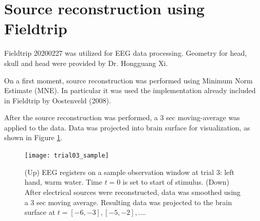 \documentclass[10pt,letterpaper]{article}
\begin{document}
\section{Source reconstruction using Fieldtrip}

Fieldtrip 20200227 was utilized for EEG data processing. 
Geometry for head, skull and head were provided by Dr. Hongguang Xi.

On a first moment, source reconstruction was performed using Minimum Norm Estimate (MNE).
In particular it was used the implementation already included in Fieldtrip by Oostenveld (2008).

After the source reconstruction was performed, a 3 sec moving-average was applied to the data.
Data was projected into brain surface for visualization, as shown in Figure \ref{fig:sample}.

\begin{figure}
\centering
	\texttt{[image: trial03\_sample]}
	\caption{(Up) EEG registers on a sample observation window at trial 3: left hand, warm water.
	Time $t=0$ is set to start of stimulus. (Down) After electrical sources were reconstructed,
	data was smoothed using a 3 sec moving average. 
	Resulting data was projected to the brain surface at $t=[-6,-3], [-5,-2], \dots$.}
	\label{fig:sample}
\end{figure}
\end{document}

